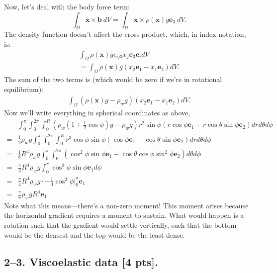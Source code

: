 Now, let's deal with the body force term:
\begin{equation*}
    \int_{ \Omega} \bm{x} \times \bm{b}~dV  = \int_{ \Omega} \bm{x} \times \rho(\bm{x}) g \bm{e}_3~dV.
\end{equation*}
The density function doesn't affect the cross product, which, in index notation, is:
\begin{align*}
    \int_\Omega \rho(\bm{x}) g\epsilon_{ij3} x_j \bm{e}_3 \bm{e}_i dV\\
    =\int_\Omega \rho(\bm{x}) g(x_2 \bm{e}_1 - x_1 \bm{e}_2) dV.
\end{align*}
The sum of the two terms is (which would be zero if we're in rotational equilibrium):
\begin{align*}
    \int_\Omega (\rho(\bm{x}) g - \rho_w g)(x_2 \bm{e}_1 - x_1 \bm{e}_2) dV.
\end{align*}
Now we'll write everything in spherical coordinates as above,
\begin{align*}
   & \int_0^\pi \int_0^{2\pi} \int_0^R \left( \rho_w\left(1+\frac{1}{2}   \cos\phi\right)g-\rho_w g \right) r^2 \sin\phi \left(r\cos\phi \bm{e}_1 - r \cos\theta \sin\phi \bm{e}_2 \right) dr d\theta d\phi\\
   =&\frac{1}{2}\rho_w g \int_0^\pi \int_0^{2\pi} \int_0^R r^3 \cos\phi \sin\phi \left(\cos\phi \bm{e}_1 - \cos\theta \sin\phi \bm{e}_2 \right) dr d\theta d\phi\\
   =&\frac{1}{8}R^4 \rho_w g \int_0^\pi \int_0^{2\pi}  \left(\cos^2\phi \sin\phi \bm{e}_1 - \cos\theta \cos\phi \sin^2 \phi \bm{e}_2 \right)  d\theta d\phi\\
    =&\frac{\pi}{4}R^4 \rho_w g \int_0^\pi  \cos^2\phi \sin\phi \bm{e}_1  d\phi\\
    =&\frac{\pi}{4}R^4 \rho_w g \cdot -\frac{1}{3}\cos^3\phi\Big|_0^\pi \bm{e}_1 \\
    =& \frac{\pi}{6} \rho_w g R^4 \bm{e}_1.
\end{align*}
Note what this means---there's a non-zero moment! 
This moment arises because the horizontal gradient requires a moment to sustain. 
What would happen is a rotation such that the gradient would settle vertically, such that the bottom would be the densest and the top would be the least dense. 

\bigskip
\subsection*{2--3. \textbf{Viscoelastic data} [4 pts].} 

